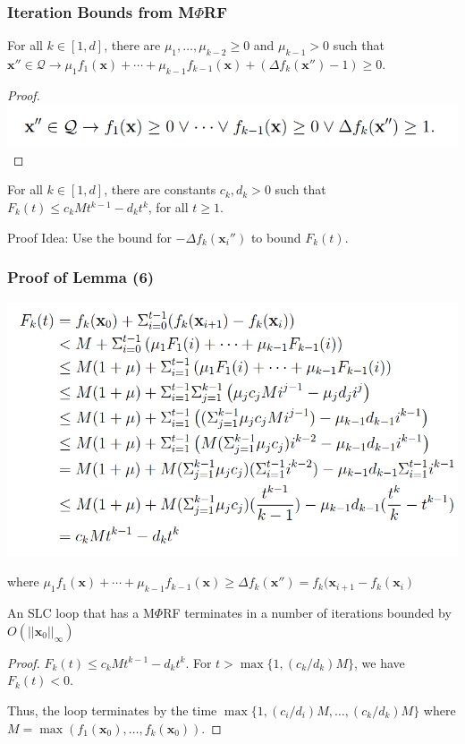 \documentclass[11pt]{beamer}
\begin{document}
\begin{frame}\frametitle{Iteration Bounds from M$\Phi$RF}
\begin{lemma}[4]
For all $k \in [1, d]$, there are $\mu_1, \ldots, \mu_{k - 2} \ge 0$ and $\mu_{k - 1} > 0$ such that $\textbf{x}''\in \mathcal{Q}\rightarrow \mu_1f_1(\textbf{x}) + \cdots + \mu_{k - 1}f_{k-1}(\textbf{x}) + (\Delta f_k(\textbf{x}'') - 1) \ge 0$.
\end{lemma}
\begin{proof}
\includegraphics[scale=0.35]{13.png}
\end{proof}
\begin{lemma}[5]
For all $k \in [1, d]$, there are constants $c_k, d_k > 0$ such that $F_k(t) \le c_kMt^{k - 1}- d_kt^k$, for all $t \ge 1 $.
\end{lemma}
Proof Idea: Use the bound for $-\Delta f_k(\textbf{x}_i '')$ to bound $F_k(t)$.
\end{frame}

\begin{frame}\frametitle{Proof of Lemma (6)}
\begin{center}
\includegraphics[scale= 0.33]{14.png}
\end{center}
where $ \mu_1f_1(\textbf{x}) + \cdots + \mu_{k - 1}f_{k-1}(\textbf{x}) \ge \Delta f_k(\textbf{x}'') = f_k(\textbf{x}_{i+1} - f_k(\textbf{x}_{i})$
\end{frame}
\begin{frame}
\begin{theorem}[6]
An SLC loop that has a M$\Phi$RF terminates in a number of iterations bounded by $O(||\textbf{x}_0||_\infty)$
\end{theorem}

\begin{proof}
$F_k(t) \le c_kMt^{k - 1}- d_kt^k$. For $t > \max\{1, (c_k/d_k)M\}$, we have $F_k(t) < 0$.

Thus, the loop terminates by the time $\max\{1, (c_i/d_i)M, \ldots, (c_k/d_k)M\}$ where $M = \max(f_1(\textbf{x}_0), \ldots, f_k(\textbf{x}_0))$.

\end{proof}
\end{frame}
\end{document}
